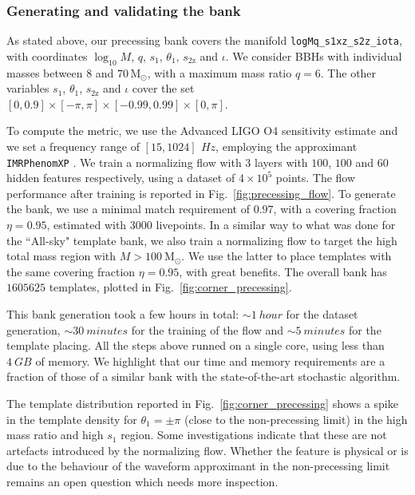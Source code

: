 \documentclass[twocolumn,showpacs,preprintnumbers,nofootinbib,prd,
superscriptaddress,10pt]{revtex4-2}
\begin{document}
\subsubsection{Generating and validating the bank}

As stated above, our precessing bank covers the manifold \texttt{logMq\_s1xz\_s2z\_iota}, with coordinates $\log_{10}M$, $q$, $s_\text{1}$, $\theta_\text{1}$, $s_\text{2z}$ and $\iota$.
We consider BBHs with individual masses between  $8$ and $70\,\mathrm{M_\odot}$, with a maximum mass ratio $q = 6$.
The other variables $s_\text{1}$, $\theta_\text{1}$, $s_\text{2z}$ and $\iota$ cover the set $[0, 0.9]\times[-\pi, \pi]\times[-0.99, 0.99]\times[0, \pi]$.

To compute the metric, we use the Advanced LIGO O4 sensitivity estimate \cite{O4_PSDs} and we set a frequency range of $[15, 1024] \,\SI{}{Hz}$, employing the approximant \texttt{IMRPhenomXP} \cite{Pratten:2020ceb}.
We train a normalizing flow with $3$ layers with $100$, $100$ and $60$ hidden features respectively, using a dataset of $4\times 10^5$ points.
The flow performance after training is reported in Fig.~\ref{fig:precessing_flow}.
To generate the bank, we use a minimal match requirement of $0.97$, with a covering fraction $\eta = 0.95$, estimated with $3000$ livepoints.
In a similar way to what was done for the ``All-sky" template bank, we also train a normalizing flow to target the high total mass region with $M>\SI{100}{\mathrm{M_\odot}}$. We use the latter to place templates with the same covering fraction $\eta = 0.95$, with great benefits.
The overall bank has $1605625$ templates, plotted in Fig.~\ref{fig:corner_precessing}.

This bank generation took a few hours in total: ${\sim \SI{1}{hour}}$ for the dataset generation, ${\sim \SI{30}{minutes}}$ for the training of the flow and ${\sim \SI{5}{minutes}}$ for the template placing.
All the steps above runned on a single core, using less than $\SI{4}{GB}$ of memory.
We highlight that our time and memory requirements are a fraction of those of a similar bank with the state-of-the-art stochastic algorithm.

The template distribution reported in Fig.~\ref{fig:corner_precessing} shows a spike in the template density for $\theta_1 = \pm\pi$ (close to the non-precessing limit) in the high mass ratio and high $s_1$ region. Some investigations indicate that these are not artefacts introduced by the normalizing flow.
Whether the feature is physical or is due to the behaviour of the waveform approximant in the non-precessing limit remains an open question which needs more inspection.
\end{document}
